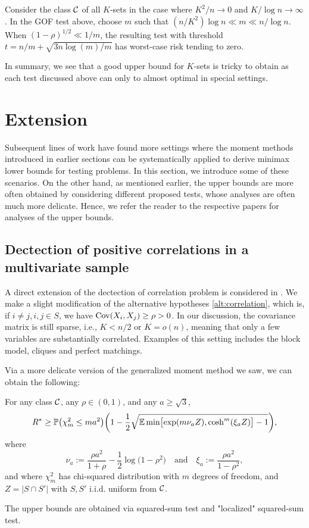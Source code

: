 \documentclass[10pt, oneside]{article}
\begin{document}
\begin{prop} \label{prpgof}
Consider the class ${\mathcal C}$ of all $K$-sets in the case where $K^2/n \to
0$ and $K/\log n \to\infty$. In the GOF test above, choose $m$ such
that $(n/K^2) \log n \ll m \ll n/\log n$. When $(1-\rho)^{1/2} \ll
1/m$, the resulting test with threshold $t = n/m + \sqrt{3 n \log(m)/m}$ has
worst-case risk tending to zero.
\end{prop}

In summary, we see that a good upper bound for $K$-sets is tricky to obtain as each test discussed above can only to almost optimal in special settings.

\section{Extension}

Subsequent lines of work have found more settings where the moment methods introduced in earlier sections can be systematically applied to derive minimax lower bounds for testing problems\cite{berthet2013optimal, arias2015correlations, arias2017detecting, neykov2019combinatorial}. In this section, we introduce some of these scenarios. 
On the other hand, as mentioned earlier, the upper bounds are more often obtained by considering different proposed tests, whose analyses are often much more delicate. Hence, we refer the reader to the respective papers for analyses of the upper bounds.

\subsection{Dectection of positive correlations in a multivariate sample}
A direct extension of the dectection of correlation problem is considered in \cite{arias2015correlations}. We make a slight modification of the alternative hypotheses \ref{alt:correlation}, which is, if $i \ne j, i,j \in S$, we have $\operatorname{Cov}(X_i, X_j) \ge \rho > 0$. In our discussion, the covariance matrix is still sparse, i.e., $K < n/2$ or $K = o(n)$, meaning that only a few variables are substantially correlated. Examples of this setting includes the block model, cliques and perfect matchings. 

Via a more delicate version of the generalized moment method we saw, we can obtain the following:
\begin{prop}
  For any class ${\mathcal C}$, any $\rho\in(0, 1)$, and any $a \ge\sqrt{3}$,
  \begin{equation}
  \label{lower} R^* \geq\mathbb{P} \bigl(\chi_m^2 \le m
  a^2 \bigr) \biggl(1 - \frac{1}2 \sqrt{\mathbb{E}\min \bigl[\exp (m
  \nu_a Z ), \cosh^m(\xi_a Z) \bigr] - 1}
  \biggr),
  \end{equation}
  where
  \[
  \nu_a := \frac{\rho a^2}{1+\rho} - \frac{1}2 \log\bigl(1-
  \rho^2\bigr)\quad  \mbox{and}\quad  \xi_a := \frac{\rho a^2}{1-\rho^2},
  \]
  and where $\chi_m^2$ has chi-squared distribution with $m$ degrees of
  freedom, and $Z=|S \cap S'|$ with $S, S'$ i.i.d. uniform from ${\mathcal C}$.
\end{prop}
The upper bounds are obtained via squared-sum test and "localized" squared-sum test. 
\end{document}

